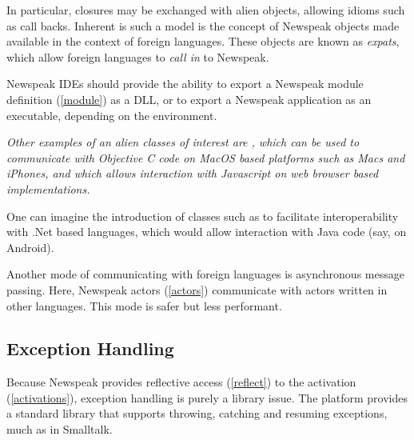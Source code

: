 \documentclass{article}
\begin{document}
In particular, closures may be exchanged with alien objects, allowing idioms such as call backs. Inherent is such a model is the concept of Newspeak objects made available in the context of foreign languages. These objects are known as {\em expats}, which allow 
foreign languages to {\em call in} to Newspeak.

Newspeak IDEs should provide the ability to export a Newspeak module definition  (\ref{module}) as a DLL, or to export a Newspeak application as an executable, depending on the environment.

{\it 
Other examples of an alien classes of interest are , which can be used to communicate with Objective C code on MacOS based platforms such as Macs and iPhones, and
 which allows interaction with Javascript on web browser based implementations.

One can imagine the introduction of classes such as  to facilitate interoperability with .Net based languages,  which would allow interaction with Java code (say, on Android). 
}

Another mode of communicating with foreign languages is asynchronous message passing. Here, Newspeak actors (\ref{actors}) communicate with actors written in other languages. This mode is safer but less performant.

\subsection{Exception Handling}
\label{exceptions}

Because Newspeak provides reflective access (\ref{reflect}) to the activation (\ref{activations}), exception handling is purely a library issue. The platform provides a standard library that supports throwing, catching and resuming exceptions, much as in Smalltalk.


 
\end{document}
